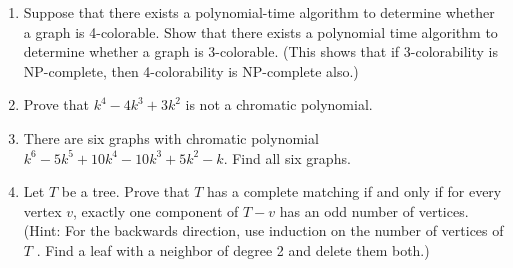 \documentclass{article}
\begin{document}
\begin{enumerate}

\item Suppose that there exists a polynomial-time algorithm to determine whether a graph is 4-colorable. Show that there exists a polynomial time algorithm to determine whether a graph is 3-colorable. (This shows that if 3-colorability is NP-complete, then 4-colorability is NP-complete also.)

\item Prove that $k^4 - 4k^3 + 3k^2$ is not a chromatic polynomial.

\item There are six graphs with chromatic polynomial $k^6 - 5k^5 + 10k^4 - 10k^3 + 5k^2 - k$. Find
all six graphs.




\item Let $T$ be a tree. Prove that $T$ has a complete matching if and only if for every vertex $v$, exactly one component of $T-v$ has an odd number of vertices. (Hint: For the backwards direction, use induction on the number of vertices of $T$ . Find a leaf with a neighbor of degree 2 and delete them both.)




\end{enumerate}
\end{document}

